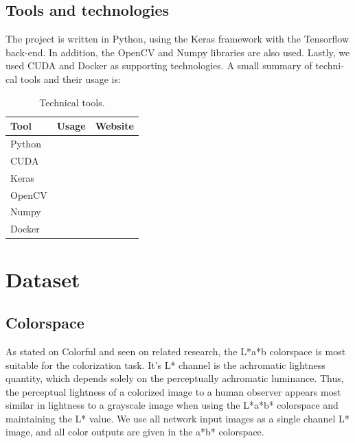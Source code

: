 \documentclass[12pt,openright,twoside,a4paper,english]{abntex2}
\begin{document}
\begin{otherlanguage}{english}
\subsection{Tools and technologies}
The project is written in Python, using the Keras framework with the Tensorflow back-end. In addition, the OpenCV and Numpy libraries are also used. Lastly, we used CUDA and Docker as supporting technologies. A small summary of technical tools and their usage is:

\begin{table}[H]
    \centering
    \begin{tabular}{lll}
    Tool            & Usage                 & Website             \\ \hline
    Python          &                       &                     \\ \hline
    CUDA            &                       &                     \\ \hline
    Keras           &                       &                     \\ \hline
    OpenCV          &                       &                     \\ \hline
    Numpy           &                       &                     \\ \hline
    Docker          &                       &                     \\ \hline
    \end{tabular}
    \label{table:tools}
    \caption{Technical tools.}
\end{table}

\section{Dataset}
\subsection{Colorspace}
As stated on Colorful \cite{colorful} and seen on related research, the L*a*b colorspace is most suitable for the colorization task. It's L* channel is the achromatic lightness quantity, which depends solely on the perceptually achromatic luminance. Thus, the perceptual lightness of a colorized image to a human observer appears most similar in lightness to a grayscale image when using the L*a*b* colorspace and maintaining the L* value. We use all network input images as a single channel L* image, and all color outputs are given in the a*b* colorspace.


\end{otherlanguage}
\end{document}
